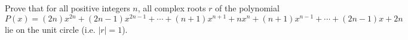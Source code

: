 Prove that for all positive integers $n$, all complex roots $r$ of the polynomial \[P\left(x\right)=\left(2n\right)x^{2n}+\left(2n-1\right)x^{2n-1}+\cdots+\left(n+1\right)x^{n+1}+nx^n+\left(n+1\right)x^{n-1}+\cdots+\left(2n-1\right)x+2n\] lie on the unit circle (i.e. $\left|r\right|=1$).